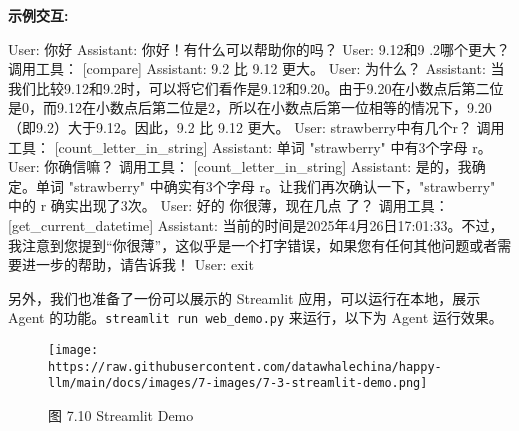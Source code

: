 \documentclass[
]{article}
\newenvironment{Shaded}{}{}
\newcommand{\ExtensionTok}[1]{#1}
\newcommand{\NormalTok}[1]{#1}
\newcommand{\PreprocessorTok}[1]{\textcolor[rgb]{0.74,0.48,0.00}{#1}}
\newcommand{\StringTok}[1]{\textcolor[rgb]{0.25,0.44,0.63}{#1}}
\begin{document}
\textbf{示例交互:}

\begin{Shaded}
\begin{Highlighting}[]
\ExtensionTok{User:}\NormalTok{ 你好}
\ExtensionTok{Assistant:}\NormalTok{  你好！有什么可以帮助你的吗？}
\ExtensionTok{User:}\NormalTok{ 9.12和9 .2哪个更大？}
\ExtensionTok{调用工具：} \PreprocessorTok{[}\StringTok{\textquotesingle{}compare\textquotesingle{}}\PreprocessorTok{]}
\ExtensionTok{Assistant:}\NormalTok{  9.2 比 9.12 更大。}
\ExtensionTok{User:}\NormalTok{ 为什么？}
\ExtensionTok{Assistant:}\NormalTok{  当我们比较9.12和9.2时，可以将它们看作是9.12和9.20。由于9.20在小数点后第二位是0，而9.12在小数点后第二位是2，所以在小数点后第一位相等的情况下，9.20（即9.2）大于9.12。因此，9.2 比 9.12 更大。}
\ExtensionTok{User:}\NormalTok{ strawberry中有几个r？}
\ExtensionTok{调用工具：} \PreprocessorTok{[}\StringTok{\textquotesingle{}count\_letter\_in\_string\textquotesingle{}}\PreprocessorTok{]}
\ExtensionTok{Assistant:}\NormalTok{  单词 }\StringTok{"strawberry"}\NormalTok{ 中有3个字母 }\StringTok{\textquotesingle{}r\textquotesingle{}}\NormalTok{。}
\ExtensionTok{User:}\NormalTok{ 你确信嘛？}
\ExtensionTok{调用工具：} \PreprocessorTok{[}\StringTok{\textquotesingle{}count\_letter\_in\_string\textquotesingle{}}\PreprocessorTok{]}
\ExtensionTok{Assistant:}\NormalTok{  是的，我确定。单词 }\StringTok{"strawberry"}\NormalTok{ 中确实有3个字母 }\StringTok{\textquotesingle{}r\textquotesingle{}}\NormalTok{。让我们再次确认一下，}\StringTok{"strawberry"}\NormalTok{ 中的 }\StringTok{\textquotesingle{}r\textquotesingle{}}\NormalTok{ 确实出现了3次。}
\ExtensionTok{User:}\NormalTok{ 好的 你很薄，现在几点 了？}
\ExtensionTok{调用工具：} \PreprocessorTok{[}\StringTok{\textquotesingle{}get\_current\_datetime\textquotesingle{}}\PreprocessorTok{]}
\ExtensionTok{Assistant:}\NormalTok{  当前的时间是2025年4月26日17:01:33。不过，我注意到您提到“你很薄”，这似乎是一个打字错误，如果您有任何其他问题或者需要进一步的帮助，请告诉我！}
\ExtensionTok{User:}\NormalTok{ exit}
\end{Highlighting}
\end{Shaded}

另外，我们也准备了一份可以展示的 Streamlit 应用，可以运行在本地，展示
Agent 的功能。\texttt{streamlit\ run\ web\_demo.py} 来运行，以下为 Agent
运行效果。

\begin{figure}[htbp]\centering
\texttt{[image: https://raw.githubusercontent.com/datawhalechina/happy-llm/main/docs/images/7-images/7-3-streamlit-demo.png]}
\caption{图 7.10 Streamlit Demo}
\end{figure}
\end{document}
